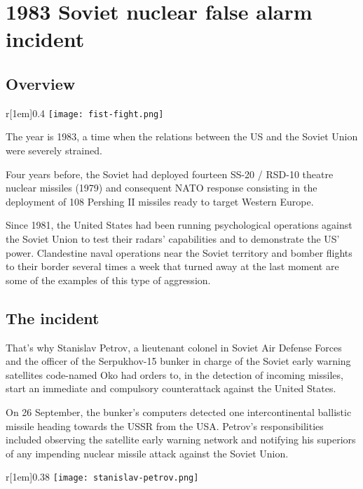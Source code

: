 \documentclass[compilation.tex]{subfiles}
\begin{document}
\section{1983 Soviet nuclear false alarm incident}

\subsection{Overview}

\begin{wrapfigure}[11]{r}[1em]{0.4\textwidth}
	\vspace{-\baselineskip}
	\texttt{[image: fist-fight.png]}
\end{wrapfigure}

The year is 1983, a time when the relations between the US and the Soviet Union were severely strained.

Four years before, the Soviet had deployed fourteen SS-20 / RSD-10 theatre nuclear missiles (1979) and consequent NATO response consisting in the deployment of 108 Pershing II missiles ready to target Western  Europe.

Since 1981, the United States had been running psychological operations against the Soviet Union to test their radars’ capabilities and to demonstrate the US’ power.
Clandestine naval operations near the Soviet territory and bomber flights to their border several times a week that turned away at the last moment are some of the examples of this type of aggression.

\subsection{The incident}

That’s why Stanislav Petrov, a lieutenant colonel in Soviet Air Defense Forces and the officer of the Serpukhov-15 bunker in charge of the Soviet early warning satellites code-named Oko had orders to, in the detection of incoming missiles, start an immediate and compulsory counterattack against the United States.

On 26 September, the bunker’s computers detected one intercontinental ballistic missile heading towards the USSR from the USA.
Petrov's responsibilities included observing the satellite early warning network and notifying his superiors of any impending nuclear missile attack against the Soviet Union.

\begin{wrapfigure}[12]{r}[1em]{0.38\textwidth}
	\vspace{-\baselineskip}
	\texttt{[image: stanislav-petrov.png]}
\end{wrapfigure}
\end{document}
